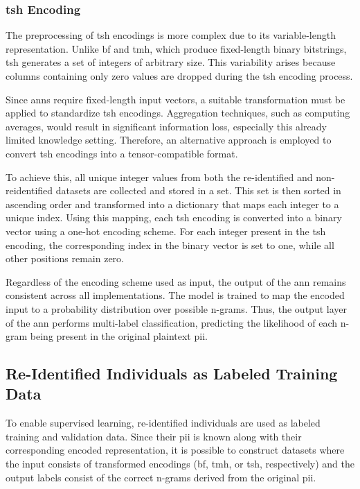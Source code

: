\subsubsection{\ac{tsh} Encoding}

The preprocessing of \ac{tsh} encodings is more complex due to its variable-length representation.
Unlike \ac{bf} and \ac{tmh}, which produce fixed-length binary bitstrings, \ac{tsh} generates a set of integers of arbitrary size.
This variability arises because columns containing only zero values are dropped during the \ac{tsh} encoding process.

Since \acp{ann} require fixed-length input vectors, a suitable transformation must be applied to standardize \ac{tsh} encodings.
Aggregation techniques, such as computing averages, would result in significant information loss, especially this already limited knowledge setting.
Therefore, an alternative approach is employed to convert \ac{tsh} encodings into a tensor-compatible format.

To achieve this, all unique integer values from both the re-identified and non-reidentified datasets are collected and stored in a set.
This set is then sorted in ascending order and transformed into a dictionary that maps each integer to a unique index.
Using this mapping, each \ac{tsh} encoding is converted into a binary vector using a one-hot encoding scheme.
For each integer present in the \ac{tsh} encoding, the corresponding index in the binary vector is set to one, while all other positions remain zero.

Regardless of the encoding scheme used as input, the output of the \ac{ann} remains consistent across all implementations.
The model is trained to map the encoded input to a probability distribution over possible n-grams.
Thus, the output layer of the \ac{ann} performs multi-label classification, predicting the likelihood of each n-gram being present in the original plaintext \ac{pii}.

\subsection{Re-Identified Individuals as Labeled Training Data}

To enable supervised learning, re-identified individuals are used as labeled training and validation data.
Since their \ac{pii} is known along with their corresponding encoded representation, it is possible to construct datasets where the input consists of transformed encodings (\ac{bf}, \ac{tmh}, or \ac{tsh}, respectively) and the output labels consist of the correct n-grams derived from the original \ac{pii}.

